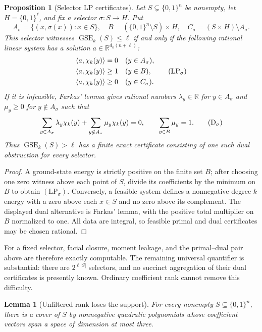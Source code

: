 \documentclass{article}
\newcommand{\GSE}{\operatorname{GSE}}
\newcommand{\bits}{\{0,1\}}
\newtheorem{lemma}{Lemma}
\newtheorem{proposition}{Proposition}
\begin{document}
\begin{proposition}[Selector LP certificates]
\label{prop:selector-lp}
Let $S\subsetneq\bits^n$ be nonempty, let $H=\bits^\ell$, and fix a selector
$\sigma:S\to H$.  Put
\[
  A_\sigma=\{(x,\sigma(x)):x\in S\},
  \quad B=(\bits^n\setminus S)\times H,
  \quad C_\sigma=(S\times H)\setminus A_\sigma.
\]
This selector witnesses $\GSE_k(S)\le\ell$ if and only if the following
rational linear system has a solution $a\in\mathbb R^{d_k(n+\ell)}$:
\[
\begin{aligned}
  \langle a,\chi_k(y)\rangle&=0 &&(y\in A_\sigma),\\
  \langle a,\chi_k(y)\rangle&\ge1 &&(y\in B),\\
  \langle a,\chi_k(y)\rangle&\ge0 &&(y\in C_\sigma).
\end{aligned}
\tag{$\mathrm{LP}_\sigma$}
\]
If it is infeasible, Farkas' lemma gives rational numbers
$\lambda_y\in\mathbb R$ for $y\in A_\sigma$ and
$\mu_y\ge0$ for $y\notin A_\sigma$ such that
\[
  \sum_{y\in A_\sigma}\lambda_y\chi_k(y)
  +\sum_{y\notin A_\sigma}\mu_y\chi_k(y)=0,
  \qquad
  \sum_{y\in B}\mu_y=1.
\tag{$\mathrm{D}_\sigma$}
\]
Thus $\GSE_k(S)>\ell$ has a finite exact certificate consisting of one such
dual obstruction for every selector.
\end{proposition}

\begin{proof}
A ground-state energy is strictly positive on the finite set $B$; after
choosing one zero witness above each point of $S$, divide its coefficients by
the minimum on $B$ to obtain $(\mathrm{LP}_\sigma)$.  Conversely, a feasible
system defines a nonnegative degree-$k$ energy with a zero above each
$x\in S$ and no zero above its complement.  The displayed dual alternative is
Farkas' lemma, with the positive total multiplier on $B$ normalized to one.
All data are integral, so feasible primal and dual certificates may be chosen
rational.
\end{proof}

For a fixed selector, facial closure, moment leakage, and the primal--dual pair
above are therefore exactly computable.  The remaining universal quantifier is
substantial: there are $2^{\ell|S|}$ selectors, and no succinct aggregation of
their dual certificates is presently known.  Ordinary coefficient rank cannot
remove this difficulty.

\begin{lemma}[Unfiltered rank loses the support]
\label{lem:rank-obstruction}
For every nonempty $S\subseteq\bits^n$, there is a cover of $S$ by
nonnegative quadratic polynomials whose coefficient vectors span a space of
dimension at most three.
\end{lemma}
\end{document}
